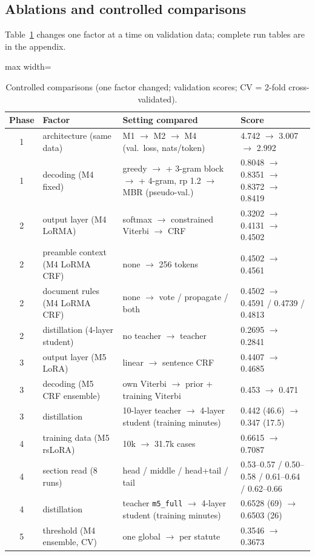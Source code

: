 \documentclass[11pt, oneside]{article}
\newcommand{\run}[1]{\texttt{#1}}
\begin{document}
\subsection{Ablations and controlled comparisons}
Table~\ref{tab:ablations} changes one factor at a time on validation data; complete run tables are in the appendix.

\begin{table}[htbp]
\centering\scriptsize
\caption{Controlled comparisons (one factor changed; validation scores; CV = 2-fold cross-validated).}
\label{tab:ablations}
\begin{adjustbox}{max width=\textwidth}
\begin{tabular}{clll}
\toprule
Phase & Factor & Setting compared & Score\\
\midrule
1 & architecture (same data) & M1 $\to$ M2 $\to$ M4 (val.\ loss, nats/token) & 4.742 $\to$ 3.007 $\to$ 2.992\\
1 & decoding (M4 fixed) & greedy $\to$ + 3-gram block $\to$ + 4-gram, rp 1.2 $\to$ MBR (pseudo-val.) & 0.8048 $\to$ 0.8351 $\to$ 0.8372 $\to$ 0.8419\\
2 & output layer (M4 LoRMA) & softmax $\to$ constrained Viterbi $\to$ CRF & 0.3202 $\to$ 0.4131 $\to$ 0.4502\\
2 & preamble context (M4 LoRMA CRF) & none $\to$ 256 tokens & 0.4502 $\to$ 0.4561\\
2 & document rules (M4 LoRMA CRF) & none $\to$ vote / propagate / both & 0.4502 $\to$ 0.4591 / 0.4739 / 0.4813\\
2 & distillation (4-layer student) & no teacher $\to$ teacher & 0.2695 $\to$ 0.2841\\
3 & output layer (M5 LoRA) & linear $\to$ sentence CRF & 0.4407 $\to$ 0.4685\\
3 & decoding (M5 CRF ensemble) & own Viterbi $\to$ prior + training Viterbi & 0.453 $\to$ 0.471\\
3 & distillation & 10-layer teacher $\to$ 4-layer student (training minutes) & 0.442 (46.6) $\to$ 0.347 (17.5)\\
4 & training data (M5 rsLoRA) & 10k $\to$ 31.7k cases & 0.6615 $\to$ 0.7087\\
4 & section read (8 runs) & head / middle / head+tail / tail & 0.53--0.57 / 0.50--0.58 / 0.61--0.64 / 0.62--0.66\\
4 & distillation & teacher \run{m5\_full} $\to$ 4-layer student (training minutes) & 0.6528 (69) $\to$ 0.6503 (26)\\
5 & threshold (M4 ensemble, CV) & one global $\to$ per statute & 0.3546 $\to$ 0.3673\\

\end{tabular}
\end{adjustbox}
\end{table}
\end{document}
